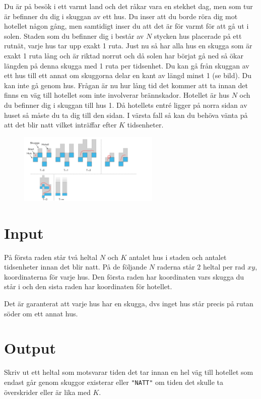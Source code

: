 
Du är på besök i ett varmt land och det råkar vara en stekhet dag, men som tur är befinner du dig i skuggan av ett hus. Du inser att du borde röra dig mot hotellet någon gång, men samtidigt inser du att det är för varmt för att gå ut i solen. Staden som du befinner dig i består av $N$ stycken hus placerade på ett rutnät, varje hus tar upp exakt 1 ruta. Just nu så har alla hus en skugga som är exakt 1 ruta lång och är riktad norrut och då solen har börjat gå ned så ökar längden på denna skugga med 1 ruta per tidsenhet. Du kan gå från skuggan av ett hus till ett annat om skuggorna delar en kant av längd minst 1 (se bild). Du kan inte gå genom hus. Frågan är nu hur lång tid det kommer att ta innan det finns en väg till hotellet som inte involverar brännskador. Hotellet är hus $N$ och du befinner dig i skuggan till hus 1. Då hotellets entré ligger på norra sidan av huset så måste du ta dig till den sidan. I värsta fall så kan du behöva vänta på att det blir natt vilket inträffar efter $K$ tidsenheter.

\begin{figure}[ht!]
\centering
\includegraphics[width=0.6\textwidth]{skuggor.png}
\label{overflow}
\end{figure}

\section*{Input}
På första raden står två heltal $N$ och $K$ antalet hus i staden och antalet tidsenheter innan det blir natt. På de följande $N$ raderna står 2 heltal per rad $x y$, koordinaterna för varje hus. Den första raden har koordinaten vars skugga du står i och den sista raden har koordinaten för hotellet.

Det är garanterat att varje hus har en skugga, dvs inget hus står precis på rutan söder om ett annat hus.

\section*{Output}
Skriv ut ett heltal som motsvarar tiden det tar innan en hel väg till hotellet som endast går genom skuggor existerar eller \texttt{"NATT"} om tiden det skulle ta överskrider eller är lika med $K$.

